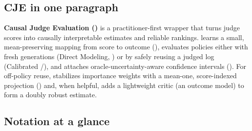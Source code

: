 \subsection{CJE in one paragraph}

\textbf{Causal Judge Evaluation (\cje)} is a practitioner-first wrapper that turns judge scores into causally interpretable estimates and reliable rankings. \cje{} learns a small, mean-preserving mapping from score to outcome (\autocal), evaluates policies either with fresh generations (Direct Modeling, \dm) or by safely reusing a judged log (Calibrated \ips/\dr), and attaches oracle-uncertainty-aware confidence intervals (\oua). For off-policy reuse, \cje{} stabilizes importance weights with a mean-one, score-indexed projection (\simcal) and, when helpful, adds a lightweight critic (an outcome model) to form a doubly robust estimate.

\subsection{Notation at a glance}

